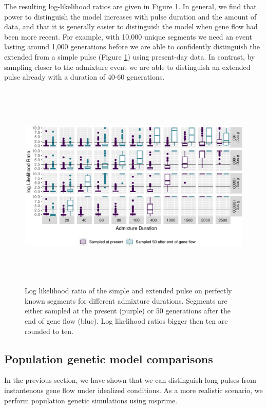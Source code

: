 \documentclass[11pt]{article}
\begin{document}

 The resulting log-likelihood ratios are given in Figure \ref{fig:fig1_1}. In general, we find that power to distinguish the model increases with pulse duration and the amount of data, and that it is generally easier to distinguish the model when gene flow had been more recent.  For example, with 10,000 unique segments we need an event lasting around 1,000 generations before we are able to confidently distinguish the extended from a simple pulse (Figure \ref{fig:fig1_1}) using present-day data. In contrast, by sampling closer to the admixture event we are able to distinguish an extended pulse already with a duration of 40-60 generations.

\begin{figure}
\centering
\includegraphics[width=16cm,height=10cm,keepaspectratio]{ATE_Revisions_files/figure-latex/figR1-1.pdf}
\caption{\label{fig:fig1_1} Log likelihood ratio of the simple and extended pulse on perfectly known segments for different admixture durations. Segments are either sampled at the present (purple) or 50 generations after the end of gene flow (blue). Log likelihood ratios bigger then ten are rounded to ten.}
\end{figure}


\subsection{Population genetic model comparisons}\label{Model comparison}
In the previous section, we have shown that we can distinguish long pulses from instantenous gene flow under idealized conditions. As a more realistic scenario, we perform population genetic simulations using  msprime\citep{kelleher_efficient_2016}. 
\end{document}
